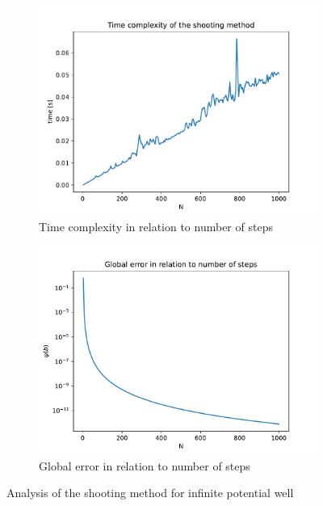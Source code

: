 \documentclass[12pt, a4paper]{article}
\begin{document}
\begin{figure}[hbtp]
\begin{subfigure}{0.5\textwidth}
  \includegraphics[width=\linewidth]{time_complexity_shoot.pdf}
  \caption{Time complexity in relation to number of steps} \label{fig:c}
  \end{subfigure}
  \hspace*{\fill}
  \begin{subfigure}{0.5\textwidth}
  \includegraphics[width=\linewidth]{error_N.pdf}
  \caption{Global error in relation to number of steps} \label{fig:d}
  \end{subfigure}
  \caption{Analysis of the shooting method for infinite potential well} \label{fig:1}
\end{figure}
 
\end{document}
